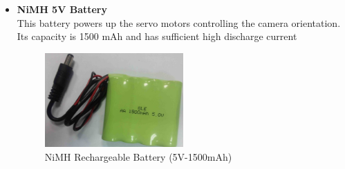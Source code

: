 \documentclass[12pt]{book}
\begin{document}
\begin{itemize}
	\item \textbf{NiMH 5V Battery}\\
	This battery powers up the servo motors controlling the camera orientation. Its capacity is 1500 mAh and has sufficient high discharge current
	\begin{figure}
		\centering
		\includegraphics[width =0.5\textwidth]{Fig/Electronics/bat5.jpg}
		\caption{NiMH Rechargeable Battery (5V-1500mAh)}
		\label{fig:bat5}
	\end{figure}
	
\end{itemize}
\end{document}
